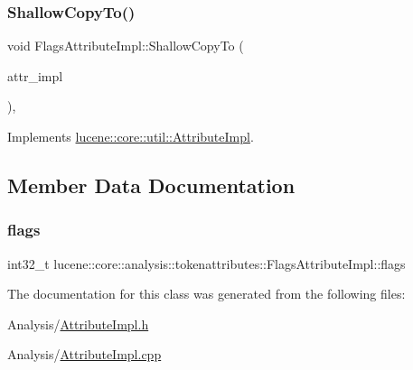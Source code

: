 \subsubsection{\texorpdfstring{Shallow\+Copy\+To()}{ShallowCopyTo()}}
{\footnotesize\ttfamily void Flags\+Attribute\+Impl\+::\+Shallow\+Copy\+To (\begin{DoxyParamCaption}\item[{\mbox{\hyperlink{classlucene_1_1core_1_1util_1_1AttributeImpl}{lucene\+::core\+::util\+::\+Attribute\+Impl}} \&}]{attr\+\_\+impl }\end{DoxyParamCaption})\hspace{0.3cm}{\ttfamily [override]}, {\ttfamily [virtual]}}



Implements \mbox{\hyperlink{classlucene_1_1core_1_1util_1_1AttributeImpl_a010e8937832f53139c8fe42757476895}{lucene\+::core\+::util\+::\+Attribute\+Impl}}.



\subsection{Member Data Documentation}
\mbox{\label{classlucene_1_1core_1_1analysis_1_1tokenattributes_1_1FlagsAttributeImpl_ac0a726a7b082414bcac0d9a5dc9ab4bb}} 
\subsubsection{\texorpdfstring{flags}{flags}}
{\footnotesize\ttfamily int32\+\_\+t lucene\+::core\+::analysis\+::tokenattributes\+::\+Flags\+Attribute\+Impl\+::flags\hspace{0.3cm}{\ttfamily [private]}}



The documentation for this class was generated from the following files\+:\begin{DoxyCompactItemize}
\item 
Analysis/\mbox{\hyperlink{AttributeImpl_8h}{Attribute\+Impl.\+h}}\item 
Analysis/\mbox{\hyperlink{AttributeImpl_8cpp}{Attribute\+Impl.\+cpp}}\end{DoxyCompactItemize}
